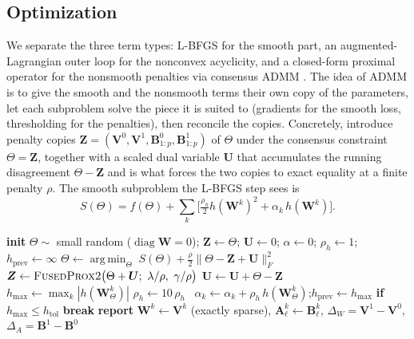 \documentclass{article}
\newcommand{\W}{\bm{W}}
\newcommand{\A}{\bm{A}}
\newcommand{\Z}{\bm{Z}}
\newcommand{\U}{\bm{U}}
\newcommand{\Wd}{\Delta_{\!W}}
\newcommand{\Ad}{\Delta_{\!A}}
\newcommand{\diag}{\operatorname{diag}}
\DeclareMathOperator*{\argmin}{arg\,min}
\begin{document}
\subsection{Optimization}
\label{sec:opt}
We separate the three term types: L-BFGS for the smooth part, an
augmented-Lagrangian outer loop for the nonconvex acyclicity, and a closed-form
proximal operator for the nonsmooth penalties via consensus ADMM
\citep{boyd2011admm}. The idea of ADMM is to give the smooth and the nonsmooth terms
their own copy of the parameters, let each subproblem solve the piece it is suited to
(gradients for the smooth loss, thresholding for the penalties), then reconcile the
copies. Concretely, introduce penalty copies
$\Z=(\bm V^0,\bm V^1,\bm B^0_{1:p},\bm B^1_{1:p})$ of $\Theta$ under the consensus
constraint $\Theta=\Z$, together with a scaled dual variable $\U$ that accumulates the
running disagreement $\Theta-\Z$ and is what forces the two copies to exact equality at
a finite penalty $\rho$. The smooth subproblem the L-BFGS step sees is
\begin{equation}
  S(\Theta)=f(\Theta)+\sum_k\Big[\tfrac{\rho_h}{2}h(\W^k)^2+\alpha_k\,h(\W^k)\Big].
\end{equation}

\begin{algorithm}[t]
\caption{FR-tDBN: consensus ADMM inside the acyclicity augmented Lagrangian}
\label{alg:admm}
\begin{algorithmic}[1]
\State \textbf{init} $\Theta\sim$ small random ($\diag\W{=}0$); $\Z\!\gets\!\Theta$;
       $\U\!\gets\!0$; $\alpha\!\gets\!0$; $\rho_h\!\gets\!1$; $h_{\text{prev}}\!\gets\!\infty$
 
   
    \State $\Theta \gets \argmin_\Theta\; S(\Theta)+\tfrac{\rho}{2}\|\Theta-\Z+\U\|_F^2$
    \State $\Z \gets \textsc{FusedProx2}\big(\Theta+\U;\ \lambda/\rho,\ \gamma/\rho\big)$
           \Comment{closed-form, exact zeros; $\diag\bm V{=}0$}
    \State $\U \gets \U + \Theta - \Z$ 
  \EndFor
  \State $h_{\max}\gets\max_k|h(\W^k_\Theta)|$
       \State $\rho_h\gets 10\,\rho_h$
  \Else\ \State $\alpha_k\gets\alpha_k+\rho_h\,h(\W^k_\Theta)$;\quad $h_{\text{prev}}\gets h_{\max}$
  \EndIf
  \State \textbf{if} $h_{\max}\le h_{\text{tol}}$ \textbf{break}
\EndFor
\State \textbf{report} $\W^k\!\gets\!\bm V^k$ (exactly sparse), $\A^k_\ell\!\gets\!\bm B^k_\ell$,
       $\Wd=\bm V^1-\bm V^0$, $\Ad=\bm B^1-\bm B^0$
\end{algorithmic}
\end{algorithm}
\end{document}
